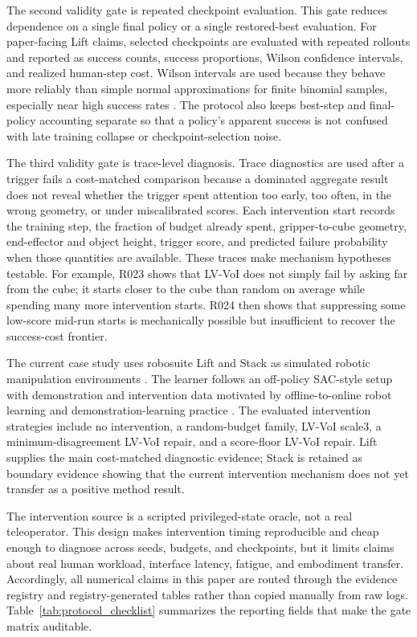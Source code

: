 The second validity gate is repeated checkpoint evaluation. This gate reduces dependence on a single final policy or a single restored-best evaluation. For paper-facing Lift claims, selected checkpoints are evaluated with repeated rollouts and reported as success counts, success proportions, Wilson confidence intervals, and realized human-step cost. Wilson intervals are used because they behave more reliably than simple normal approximations for finite binomial samples, especially near high success rates \cite{wilson1927score}. The protocol also keeps best-step and final-policy accounting separate so that a policy's apparent success is not confused with late training collapse or checkpoint-selection noise.

The third validity gate is trace-level diagnosis. Trace diagnostics are used after a trigger fails a cost-matched comparison because a dominated aggregate result does not reveal whether the trigger spent attention too early, too often, in the wrong geometry, or under miscalibrated scores. Each intervention start records the training step, the fraction of budget already spent, gripper-to-cube geometry, end-effector and object height, trigger score, and predicted failure probability when those quantities are available. These traces make mechanism hypotheses testable. For example, R023 shows that LV-VoI does not simply fail by asking far from the cube; it starts closer to the cube than random on average while spending many more intervention starts. R024 then shows that suppressing some low-score mid-run starts is mechanically possible but insufficient to recover the success-cost frontier.

The current case study uses robosuite Lift and Stack as simulated robotic manipulation environments \cite{robosuite2020}. The learner follows an off-policy SAC-style setup \cite{haarnoja2018sac,sac2018applications} with demonstration and intervention data motivated by offline-to-online robot learning and demonstration-learning practice \cite{ball2023rlpd,mandlekar2021robomimic}. The evaluated intervention strategies include no intervention, a random-budget family, LV-VoI scale3, a minimum-disagreement LV-VoI repair, and a score-floor LV-VoI repair. Lift supplies the main cost-matched diagnostic evidence; Stack is retained as boundary evidence showing that the current intervention mechanism does not yet transfer as a positive method result.

The intervention source is a scripted privileged-state oracle, not a real teleoperator. This design makes intervention timing reproducible and cheap enough to diagnose across seeds, budgets, and checkpoints, but it limits claims about real human workload, interface latency, fatigue, and embodiment transfer. Accordingly, all numerical claims in this paper are routed through the evidence registry and registry-generated tables rather than copied manually from raw logs. Table~\ref{tab:protocol_checklist} summarizes the reporting fields that make the gate matrix auditable.


